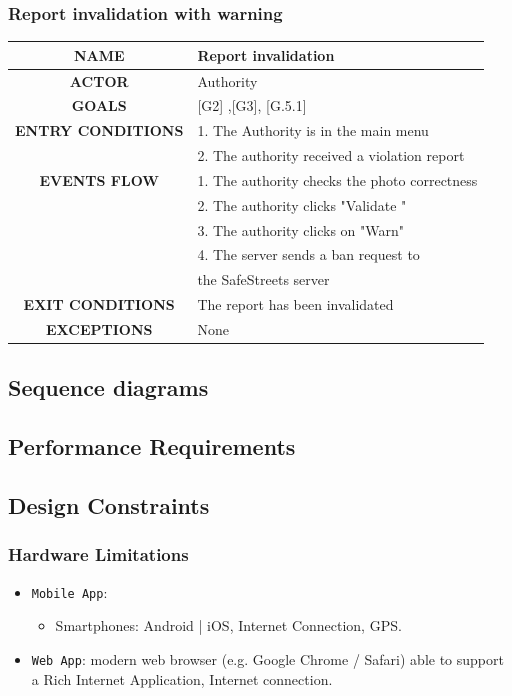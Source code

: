 \documentclass[12pt,a4paper]{article}
\begin{document}
\subsubsection{Report invalidation with warning}
		\begin{center}
			\begin{tabular}{| c | l |}
				\hline
				\textbf{NAME} & Report invalidation \\
				\hline
				\textbf{ACTOR} & Authority \\
				\hline
				\textbf{GOALS} & [G2] ,[G3], [G.5.1] \\
				\hline
				\textbf{ENTRY CONDITIONS} &1. The Authority is in the main menu \\
				&2. The authority received a violation report \\ \hline
				\textbf{EVENTS FLOW}  &
				1. The authority checks the photo correctness\\
				&2. The authority clicks "Validate " \\
				&3. The authority clicks on "Warn"  \\
				&4. The server sends a ban request to \\
				& the SafeStreets server \\
				\hline
				\textbf{EXIT CONDITIONS}  & The report has been invalidated \\ \hline
				\textbf{EXCEPTIONS} & None \\
				\hline
			\end{tabular}
		\end{center}

\subsection{Sequence diagrams}

\subsection{Performance	Requirements} 
\subsection{Design	Constraints}
\subsubsection{Hardware Limitations}
		\begin{itemize}
			\item \texttt{Mobile App}: 
				\begin{itemize}
					\item Smartphones: Android | iOS, Internet Connection, GPS.
				\end{itemize}
			\item \texttt{Web App}: modern web browser (e.g. Google Chrome / Safari) able to support a Rich Internet Application, Internet connection.
		\end{itemize}
\end{document}
